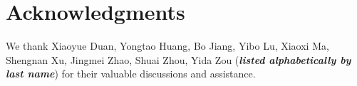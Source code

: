 \section*{Acknowledgments}
We thank
Xiaoyue Duan, 
Yongtao Huang, 
Bo Jiang, 
Yibo Lu, 
Xiaoxi Ma, 
Shengnan Xu, 
Jingmei Zhao, 
Shuai Zhou, 
Yida Zou 
(\textbf{\textit{listed alphabetically by last name}}) for their valuable discussions and assistance.